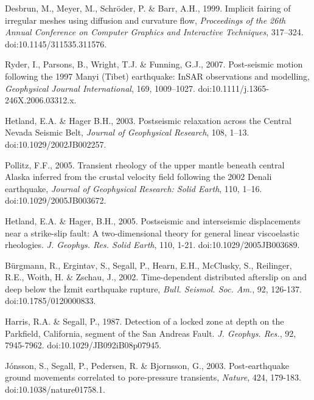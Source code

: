 \documentclass[fleqn,12pt]{article}
\begin{document}
\begin{thebibliography}{}
 Desbrun, M., Meyer, M.,
  Schr\"oder, P. \& Barr, A.H., 1999.  Implicit fairing of irregular
  meshes using diffusion and curvature flow, \textit{Proceedings of
    the 26th Annual Conference on Computer Graphics and Interactive
    Techniques}, 317–324. doi:10.1145/311535.311576.

 Ryder, I., Parsons, B.,
  Wright, T.J. \& Funning, G.J., 2007.  Post-seismic motion following
  the 1997 Manyi (Tibet) earthquake: InSAR observations and
  modelling, \textit{Geophysical Journal International}, 169,
  1009–1027. doi:10.1111/j.1365-246X.2006.03312.x.

 Hetland, E.A. \&
  Hager B.H., 2003. Postseismic relaxation across the Central
    Nevada Seismic Belt, \textit{Journal of Geophysical Research}, 108,
  1–13. doi:10.1029/2002JB002257.

Pollitz, F.F., 2005. Transient
  rheology of the upper mantle beneath central Alaska inferred from
  the crustal velocity field following the 2002 Denali earthquake,
  \textit{Journal of Geophysical Research: Solid Earth}, 110,
  1–16. doi:10.1029/2005JB003672.

 Hetland, E.A. \&
  Hager, B.H., 2005. Postseismic and interseismic displacements near a
  strike-slip fault: A two-dimensional theory for general linear
  viscoelastic rheologies. \textit{J. Geophys. Res. Solid Earth}, 110,
  1-21. doi:10.1029/2005JB003689.

 B\"urgmann, R.,
  Ergintav, S., Segall, P., Hearn, E.H., McClusky, S., Reilinger,
  R.E., Woith, H. \& Zschau, J., 2002. Time-dependent distributed
  afterslip on and deep below the \.Izmit earthquake rupture,
  \textit{Bull.  Seismol. Soc. Am.}, 92,
  126-137. doi:10.1785/0120000833.

 Harris, R.A. \&
  Segall, P., 1987. Detection of a locked zone at depth on the
  Parkfield, California, segment of the San Andreas
  Fault. \textit{J. Geophys. Res.}, 92,
  7945-7962. doi:10.1029/JB092iB08p07945.

 J\'onsson, S.,
  Segall, P., Pedersen, R. \& Bjornsson, G., 2003. Post-earthquake
  ground movements correlated to pore-pressure transients,
  \textit{Nature}, 424, 179-183. doi:10.1038/nature01758.1.


\end{thebibliography}
\end{document}
